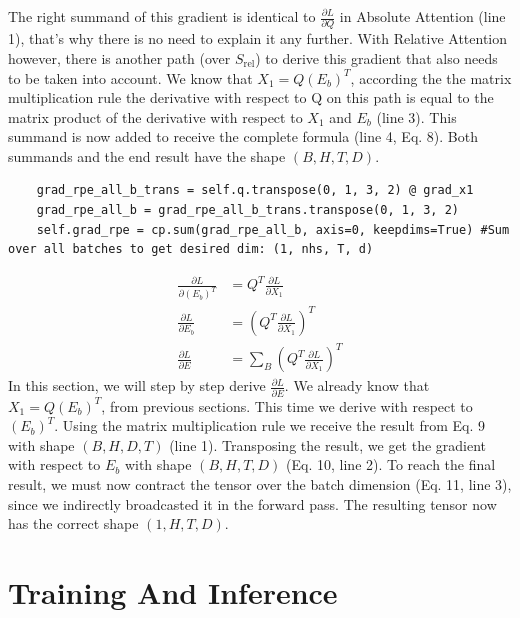 \documentclass[a4paper,12pt]{extarticle}
\begin{document}
The right summand of this gradient is identical to $\frac{\partial L}{\partial Q}$ in Absolute Attention (line 1), that's why there is no need to explain it any further. With Relative Attention however, there is another path (over $S_\text{rel}$) to derive this gradient that also needs to be taken into account. We know that $X_1 = Q(E_b)^T$, according the the matrix multiplication rule the derivative with respect to Q on this path is equal to the matrix product of the derivative with respect to $X_1$ and $E_b$ (line 3). This summand is now added to receive the complete formula (line 4, Eq. 8). Both summands and the end result have the shape $(B, H, T, D)$.
\newline
\vspace{0.1cm}
\begin{lstlisting}
    grad_rpe_all_b_trans = self.q.transpose(0, 1, 3, 2) @ grad_x1
    grad_rpe_all_b = grad_rpe_all_b_trans.transpose(0, 1, 3, 2)
    self.grad_rpe = cp.sum(grad_rpe_all_b, axis=0, keepdims=True) #Sum over all batches to get desired dim: (1, nhs, T, d)
\end{lstlisting}
\begin{align}
\frac{\partial L}{\partial (E_b)^T}
&= Q^T\frac{\partial L}{\partial X_1} \\[0.2cm]
\frac{\partial L}{\partial E_b}
&= \left(Q^T\frac{\partial L}{\partial X_1}\right)^T \\[0.2cm]
\frac{\partial L}{\partial E}
&= \sum_B\left(Q^T\frac{\partial L}{\partial X_1}\right)^T
\end{align}
In this section, we will step by step derive $\frac{\partial L}{\partial E}$. We already know that  $X_1 = Q(E_b)^T$, from previous sections. This time we derive with respect to $(E_b)^T$. Using the matrix multiplication rule we receive the result from Eq. 9 with shape $(B, H, D, T)$ (line 1). Transposing the result, we get the gradient with respect to $E_b$ with shape $(B, H, T, D)$ (Eq. 10, line 2). To reach the final result, we must now contract the tensor over the batch dimension (Eq. 11, line 3), since we indirectly broadcasted it in the forward pass. The resulting tensor now has the correct shape $(1, H, T, D)$.
\section{Training And Inference}
\end{document}
